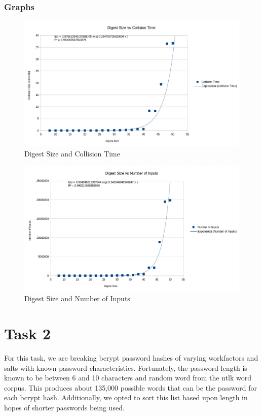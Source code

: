 \documentclass[11pt]{article}
\begin{document}
  \subsubsection{Graphs}
    \begin{figure}[h!]
      \centering
      \includegraphics[width=18cm]{Images/D vs CT.png}
      \caption{Digest Size and Collision Time}
      \label{fig:D_v_CT}
    \end{figure}
\pagebreak

    \begin{figure}[h!]
      \centering
      \includegraphics[width=18cm]{Images/D vs N o I.png}
      \caption{Digest Size and Number of Inputs}
      \label{fig:D_v_NoI}
    \end{figure}

\pagebreak
\section{Task 2}

  For this task, we are breaking bcrypt password hashes of varying 
  workfactors and salts with known password characteristics. Fortunately, 
  the password length is known to be between 6 and 10 characters and random 
  word from the ntlk word corpus. This produces about 135,000 possible words 
  that can be the password for each bcrypt hash. Additionally, we opted to 
  sort this list based upon length in hopes of shorter passwords being used.
\end{document}

